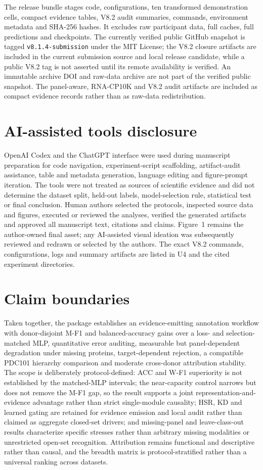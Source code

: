 \documentclass[10pt]{article}
\begin{document}
The release bundle stages code, configurations, ten transformed demonstration cells, compact evidence tables, V8.2 audit summaries, commands, environment metadata and SHA-256 hashes. It excludes raw participant data, full caches, full predictions and checkpoints. The currently verified public GitHub snapshot is tagged \texttt{v8.1.4-submission} under the MIT License; the V8.2 closure artifacts are included in the current submission source and local release candidate, while a public V8.2 tag is not asserted until its remote availability is verified. An immutable archive DOI and raw-data archive are not part of the verified public snapshot. The panel-aware, RNA-CP10K and V8.2 audit artifacts are included as compact evidence records rather than as raw-data redistribution.

\section{AI-assisted tools disclosure}

OpenAI Codex and the ChatGPT interface were used during manuscript preparation for code navigation, experiment-script scaffolding, artifact-audit assistance, table and metadata generation, language editing and figure-prompt iteration. The tools were not treated as sources of scientific evidence and did not determine the dataset split, held-out labels, model-selection rule, statistical test or final conclusion. Human authors selected the protocols, inspected source data and figures, executed or reviewed the analyses, verified the generated artifacts and approved all manuscript text, citations and claims. Figure~1 remains the author-owned final asset; any AI-assisted visual ideation was subsequently reviewed and redrawn or selected by the authors. The exact V8.2 commands, configurations, logs and summary artifacts are listed in U4 and the cited experiment directories.

\section{Claim boundaries}

Taken together, the package establishes an evidence-emitting annotation workflow with donor-disjoint M-F1 and balanced-accuracy gains over a loss- and selection-matched MLP, quantitative error auditing, measurable but panel-dependent degradation under missing proteins, target-dependent rejection, a compatible PDC101 hierarchy comparison and moderate cross-donor attribution stability. The scope is deliberately protocol-defined: ACC and W-F1 superiority is not established by the matched-MLP intervals; the near-capacity control narrows but does not remove the M-F1 gap, so the result supports a joint representation-and-evidence advantage rather than strict single-module causality; HSR, KD and learned gating are retained for evidence emission and local audit rather than claimed as aggregate closed-set drivers; and missing-panel and leave-class-out results characterize specific stresses rather than arbitrary missing modalities or unrestricted open-set recognition. Attribution remains functional and descriptive rather than causal, and the breadth matrix is protocol-stratified rather than a universal ranking across datasets.
\end{document}
